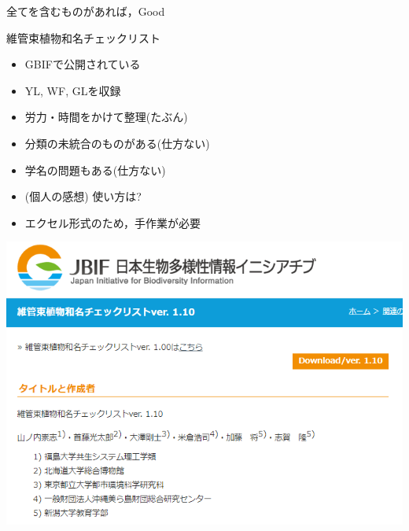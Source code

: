 \documentclass[
  a5paper,
  landscape,
  notitlepage]{report}
\providecommand{\tightlist}{%
  \setlength{\itemsep}{0pt}\setlength{\parskip}{0pt}}
\begin{document}
全てを含むものがあれば，Good

\newpage

\fontsize{32pt}{32pt}\selectfont

\begin{center}
維管束植物和名チェックリスト
\end{center}

\begin{itemize}
\tightlist
\item
  GBIFで公開されている\\
\item
  YL, WF, GLを収録\\
\item
  労力・時間をかけて整理(たぶん)\\
\item
  分類の未統合のものがある(仕方ない)\\
\item
  学名の問題もある(仕方ない)
\end{itemize}

\begin{center}
\downarrow   
\end{center}

\begin{itemize}
\tightlist
\item
  (個人の感想) 使い方は?\\
\item
  エクセル形式のため，手作業が必要
\end{itemize}

\newpage

\includegraphics{image/wamei_web.png}
\end{document}
